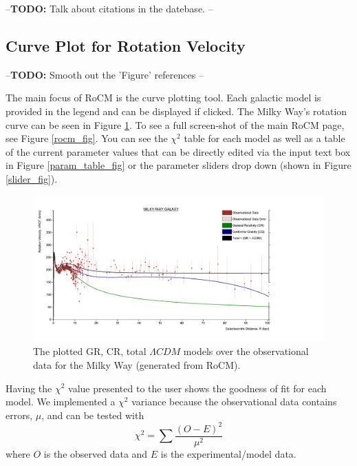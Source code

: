 \documentclass[conference]{IEEEtran-modified}
\begin{document}
--\textbf{TODO:} Talk about citations in the datebase. -- 


\subsection{Curve Plot for Rotation Velocity}

--\textbf{TODO: } Smooth out the 'Figure' references --

The main focus of RoCM is the curve plotting tool. Each galactic model is provided in the legend and can be displayed if clicked. The Milky Way's rotation curve can be seen in Figure \ref{milkywayplot}. To see a full screen-shot of the main RoCM page, see Figure \ref{rocm_fig}. You can see the $\chi^2$ table for each model %
 as well as a table of the current parameter values that can be directly edited via the input text box in Figure \ref{param_table_fig} or the parameter sliders drop down (shown in Figure \ref{slider_fig}). 

\begin{figure}[h!]
\centering
\includegraphics[width=\textwidth]{MILKY-WAY}
\caption{The plotted GR, CR, total $\Lambda CDM$ models over the observational data for the Milky Way (generated from RoCM).}
\label{milkywayplot}
\end{figure}

Having the $\chi^2$ value presented to the user shows the goodness of fit for each model. We implemented a $\chi^2$ variance because the observational data contains errors, $\mu$, and can be tested with
\begin{equation}
\chi^2 = \sum \frac{(O-E)^2}{\mu^2}
\end{equation} 
where $O$ is the observed data and $E$ is the experimental/model data. 
\end{document}
